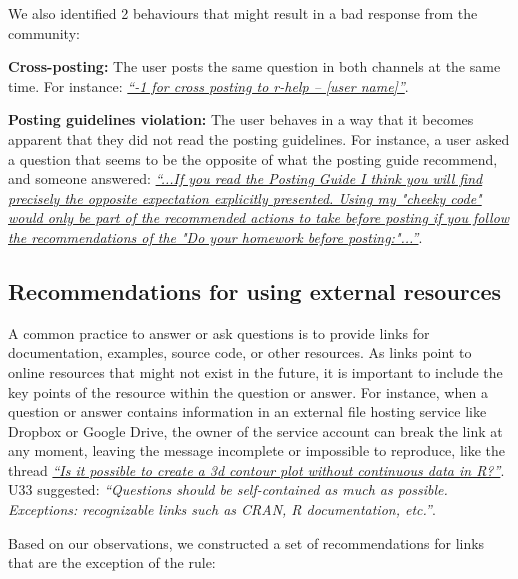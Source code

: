     We also identified 2 behaviours that might result in a bad response from the community:
    \begin{packed_enum}
        \item \textbf{Cross-posting:} The user posts the same question in both channels at the same time.
        For instance: \textit{\href{http://goo.gl/ENKrVK}{``-1 for cross posting to r-help – [user name]''}}.
        \item \textbf{Posting guidelines violation:} The user behaves in a way that it becomes apparent that they did not read the posting guidelines.
        For instance, a user asked a question that seems to be the opposite of what the posting guide recommend, and someone answered: \textit{\href{http://goo.gl/FUm1HC}{``...If you read the Posting Guide I think you will find precisely the opposite expectation explicitly presented. Using my "cheeky code" would only be part of the recommended actions to take before posting if you follow the recommendations of the "Do your homework before posting:"...''}}.
    \end{packed_enum}


\subsection{Recommendations for using external resources}

    A common practice to answer or ask questions is to provide links for documentation, examples, source code, or other resources.
    As links point to online resources that might not exist in the future, it is important to include the key points of the resource within the question or answer.
    For instance, when a question or answer contains information in an external file hosting service like Dropbox or Google Drive, the owner of the service account can break the link at any moment, leaving the message incomplete or impossible to reproduce, like the thread \textit{\href{http://goo.gl/5nanFU}{``Is it possible to create a 3d contour plot without continuous data in R?''}}.
    U33 suggested: \textit{``Questions should be self-contained as much as possible. Exceptions: recognizable links such as CRAN, R documentation, etc.''}.

    Based on our observations, we constructed a set of recommendations for links that are the exception of the rule:

